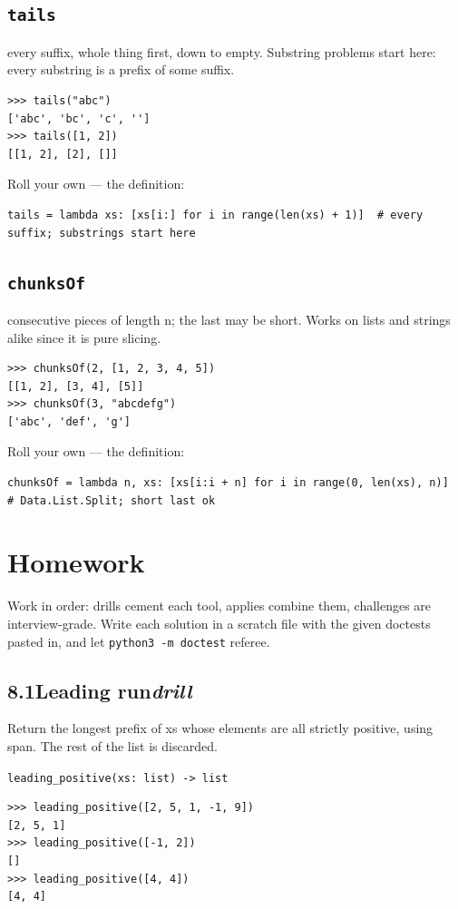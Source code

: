 \documentclass[10pt,letterpaper]{book}
\begin{document}
\subsection{\texttt{tails}}\label{def:tails}
every suffix, whole thing first, down to empty. Substring problems start here: every substring is a prefix of some suffix.
\begin{lstlisting}[style=ex]
>>> tails("abc")
['abc', 'bc', 'c', '']
>>> tails([1, 2])
[[1, 2], [2], []]
\end{lstlisting}

Roll your own --- the definition:

\begin{lstlisting}[style=ex]
tails = lambda xs: [xs[i:] for i in range(len(xs) + 1)]  # every suffix; substrings start here
\end{lstlisting}
\subsection{\texttt{chunksOf}}\label{def:chunksOf}
consecutive pieces of length n; the last may be short. Works on lists and strings alike since it is pure slicing.
\begin{lstlisting}[style=ex]
>>> chunksOf(2, [1, 2, 3, 4, 5])
[[1, 2], [3, 4], [5]]
>>> chunksOf(3, "abcdefg")
['abc', 'def', 'g']
\end{lstlisting}

Roll your own --- the definition:

\begin{lstlisting}[style=ex]
chunksOf = lambda n, xs: [xs[i:i + n] for i in range(0, len(xs), n)]  # Data.List.Split; short last ok
\end{lstlisting}
\section{Homework}
Work in order: drills cement each tool, applies combine them,
challenges are interview-grade. Write each solution in a scratch file with
the given doctests pasted in, and let \texttt{python3 -m doctest} referee.
\subsection*{8.1\quad Leading run\hfill\textnormal{\textit{drill}}}
Return the longest prefix of xs whose elements are all strictly positive, using span. The rest of the list is discarded.

\noindent\texttt{leading\_positive(xs: list) -> list}
\begin{lstlisting}[style=ex]
>>> leading_positive([2, 5, 1, -1, 9])
[2, 5, 1]
>>> leading_positive([-1, 2])
[]
>>> leading_positive([4, 4])
[4, 4]
\end{lstlisting}
\end{document}
